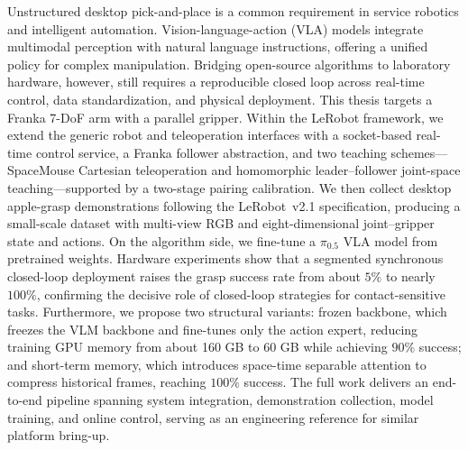 \begin{abstractEn}
Unstructured desktop pick-and-place is a common requirement in service robotics and intelligent automation. Vision-language-action (VLA) models integrate multimodal perception with natural language instructions, offering a unified policy for complex manipulation. Bridging open-source algorithms to laboratory hardware, however, still requires a reproducible closed loop across real-time control, data standardization, and physical deployment. This thesis targets a Franka 7-DoF arm with a parallel gripper. Within the LeRobot framework, we extend the generic robot and teleoperation interfaces with a socket-based real-time control service, a Franka follower abstraction, and two teaching schemes—SpaceMouse Cartesian teleoperation and homomorphic leader--follower joint-space teaching—supported by a two-stage pairing calibration. We then collect desktop apple-grasp demonstrations following the LeRobot~v2.1 specification, producing a small-scale dataset with multi-view RGB and eight-dimensional joint--gripper state and actions. On the algorithm side, we fine-tune a $\pi_{0.5}$ VLA model from pretrained weights. Hardware experiments show that a segmented synchronous closed-loop deployment raises the grasp success rate from about $5\%$ to nearly $100\%$, confirming the decisive role of closed-loop strategies for contact-sensitive tasks. Furthermore, we propose two structural variants: frozen backbone, which freezes the VLM backbone and fine-tunes only the action expert, reducing training GPU memory from about 160 GB to 60 GB while achieving $90\%$ success; and short-term memory, which introduces space-time separable attention to compress historical frames, reaching $100\%$ success. The full work delivers an end-to-end pipeline spanning system integration, demonstration collection, model training, and online control, serving as an engineering reference for similar platform bring-up.
\end{abstractEn}